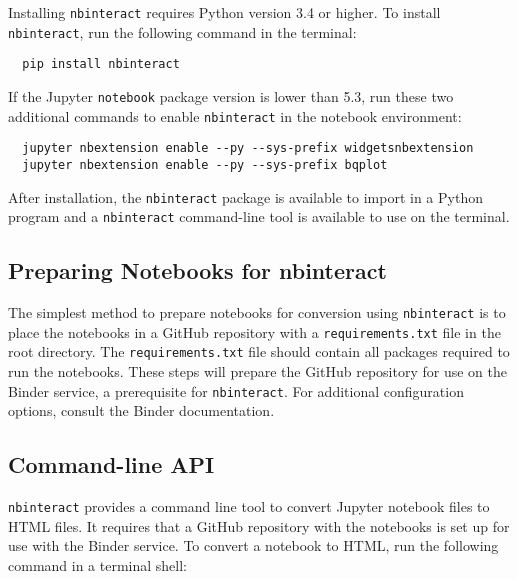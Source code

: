 \documentclass[nobib]{tufte-handout}
\newcommand{\code}[1]{\texttt{#1}}
\begin{document}
Installing \code{nbinteract} requires Python version 3.4 or higher. To install
\code{nbinteract}, run the following command in the terminal:

\begin{verbatim}
  pip install nbinteract
\end{verbatim}

If the Jupyter \code{notebook} package version is lower than 5.3, run these two
additional commands to enable \code{nbinteract} in the notebook environment:

\begin{verbatim}
  jupyter nbextension enable --py --sys-prefix widgetsnbextension
  jupyter nbextension enable --py --sys-prefix bqplot
\end{verbatim}

After installation, the \code{nbinteract} package is available to import in a
Python program and a \code{nbinteract} command-line tool is available to use on
the terminal.


\subsection{Preparing Notebooks for nbinteract} %
\label{sub:preparing_notebooks_for_nbinteract}

The simplest method to prepare notebooks for conversion using \code{nbinteract}
is to place the notebooks in a GitHub repository with a \code{requirements.txt}
file in the root directory. The \code{requirements.txt} file should contain all
packages required to run the notebooks. These steps will prepare the GitHub
repository for use on the Binder service, a prerequisite for \code{nbinteract}.
For additional configuration options, consult the Binder
documentation.


\subsection{Command-line API} %
\label{sub:command_line_api}

\code{nbinteract} provides a command line tool to convert Jupyter notebook
files to HTML files. It requires that a GitHub repository with the notebooks is
set up for use with the Binder service. To convert a notebook to HTML, run the
following command in a terminal shell:
\end{document}
